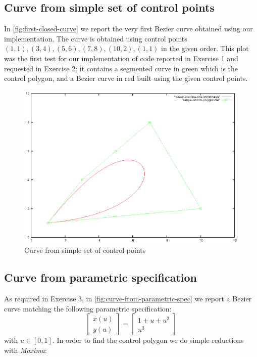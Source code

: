 \documentclass{article}
\begin{document}
\subsection{Curve from simple set of control points}
In \autoref{fig:first-closed-curve} we report the very first Bezier
curve obtained using our implementation. The curve is obtained using control
points $(1,1), (3,4), (5,6),(7,8),(10,2),(1,1)$ in the given
order. This plot was the first test for our implementation of code
reported in Exercise 1 and requested in Exercise 2: it contains a
segmented curve in green which is the control polygon, and a Bezier
curve in red built using the given control points.
\begin{figure}[h!]
  \centering
  \includegraphics{bezier-deCasteljau-curves/exercise-one}
  \caption{Curve from simple set of control points}
  \label{fig:first-closed-curve}
\end{figure}

\subsection{Curve from parametric specification}
As required in Exercise 3, in \autoref{fig:curve-from-parametric-spec}
we report a Bezier curve matching the following parametric
specification:
\begin{displaymath}
  \left [  \begin{array}{c}
      x(u) \\
      y(u)
    \end{array} \right ] = \left [
    \begin{array}{c}
      1 + u + u^2 \\
      u^3
    \end{array} \right ]
\end{displaymath}
with $u\in[0,1]$. In order to find the control polygon we do simple
reductions with \emph{Maxima}:
\end{document}
